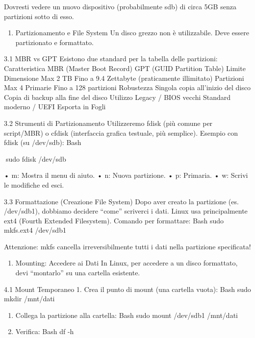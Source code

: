 \documentclass[11pt,a4paper]{article}
\providecommand{\tightlist}{%
  \setlength{\itemsep}{0pt}\setlength{\parskip}{0pt}}
\begin{document}
Dovresti vedere un nuovo dispositivo (probabilmente sdb) di circa 5GB
senza partizioni sotto di esso.

\begin{enumerate}
\def\labelenumi{\arabic{enumi}.}
\setcounter{enumi}{2}
\tightlist
\item
  Partizionamento e File System Un disco grezzo non è utilizzabile. Deve
  essere partizionato e formattato.
\end{enumerate}

3.1 MBR vs GPT Esistono due standard per la tabella delle partizioni:
Caratteristica MBR (Master Boot Record) GPT (GUID Partition Table)
Limite Dimensione Max 2 TB Fino a 9.4 Zettabyte (praticamente
illimitato) Partizioni Max 4 Primarie Fino a 128 partizioni Robustezza
Singola copia all'inizio del disco Copia di backup alla fine del disco
Utilizzo Legacy / BIOS vecchi Standard moderno / UEFI Esporta in Fogli

3.2 Strumenti di Partizionamento Utilizzeremo fdisk (più comune per
script/MBR) o cfdisk (interfaccia grafica testuale, più semplice).
Esempio con fdisk (su /dev/sdb): Bash

sudo fdisk /dev/sdb

• m: Mostra il menu di aiuto. • n: Nuova partizione. • p: Primaria. • w:
Scrivi le modifiche ed esci.

3.3 Formattazione (Creazione File System) Dopo aver creato la partizione
(es. /dev/sdb1), dobbiamo decidere ``come'' scriverci i dati. Linux usa
principalmente ext4 (Fourth Extended Filesystem). Comando per
formattare: Bash sudo mkfs.ext4 /dev/sdb1

Attenzione: mkfs cancella irreversibilmente tutti i dati nella
partizione specificata!

\begin{enumerate}
\def\labelenumi{\arabic{enumi}.}
\setcounter{enumi}{3}
\tightlist
\item
  Mounting: Accedere ai Dati In Linux, per accedere a un disco
  formattato, devi ``montarlo'' su una cartella esistente.
\end{enumerate}

4.1 Mount Temporaneo 1. Crea il punto di mount (una cartella vuota):
Bash sudo mkdir /mnt/dati

\begin{enumerate}
\def\labelenumi{\arabic{enumi}.}
\setcounter{enumi}{1}
\item
  Collega la partizione alla cartella: Bash sudo mount /dev/sdb1
  /mnt/dati
\item
  Verifica: Bash df -h
\end{enumerate}
\end{document}

